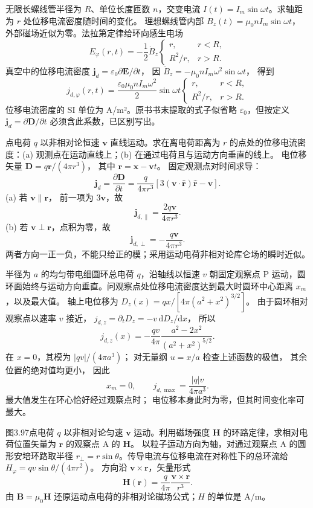 无限长螺线管半径为 $R$、单位长度匝数 $n$，交变电流
$I(t)=I_m\sin\omega t$。求轴距为 $r$ 处位移电流密度随时间的变化。
\exsolution
理想螺线管内部
$B_z(t)=\mu_0nI_m\sin\omega t$，
外部磁场近似为零。法拉第定律给环向感生电场
\[
E_\varphi(r,t)=
-\frac12\dot B_z
\begin{cases}r,&r<R,\\R^2/r,&r>R.\end{cases}
\]
真空中的位移电流密度
$\bm j_d=\varepsilon_0\partial\bm E/\partial t$，
因
$\ddot B_z=-\mu_0nI_m\omega^2\sin\omega t$，
得到
\[
\boxed{j_{d,\varphi}(r,t)=
\frac{\varepsilon_0\mu_0nI_m\omega^2}{2}
\sin\omega t
\begin{cases}r,&r<R,\\R^2/r,&r>R.\end{cases}}
\]
\excheck 位移电流密度的 SI 单位为 A/m²。原书书末提取的式子似省略 $\varepsilon_0$，但按定义 $\bm j_d=\partial\bm D/\partial t$ 必须含此系数，已区别写出。

点电荷 $q$ 以非相对论恒速 $\bm v$ 直线运动。求在离电荷距离为 $r$ 的点处的位移电流密度：(a) 观测点在运动直线上；(b) 在通过电荷且与运动方向垂直的线上。
\exsolution
电位移矢量
$\bm D=q\bm r/(4\pi r^3)$，
其中 $\bm r=\bm x-\bm vt$。
固定观测点对时间求导：
\[
\bm j_d=\frac{\partial\bm D}{\partial t}
=\frac q{4\pi r^3}
\left[3(\bm v\cdot\hat{\bm r})\hat{\bm r}-\bm v\right].
\]
(a) 若 $\bm v\parallel\bm r$，
前一项为 $3\bm v$，故
\[
\boxed{\bm j_{d,\parallel}=\frac{2q\bm v}{4\pi r^3}}.
\]
(b) 若 $\bm v\perp\bm r$，点积为零，故
\[
\boxed{\bm j_{d,\perp}=-\frac{q\bm v}{4\pi r^3}}.
\]
\excheck 两者方向一正一负，不能只给正的模；采用运动电荷非相对论库仑场的瞬时近似。

半径为 $a$ 的均匀带电细圆环总电荷 $q$，沿轴线以恒速 $v$ 朝固定观察点 P 运动，圆环面始终与运动方向垂直。问观察点处位移电流密度达到最大时圆环中心距离 $x_m$，以及最大值。
\exsolution
轴上电位移为
$D_z(x)=qx/[4\pi(a^2+x^2)^{3/2}]$。
由于圆环相对观察点以速率 $v$ 接近，
$j_{d,z}=\partial_t D_z=-v\,\mathrm dD_z/\mathrm dx$，
所以
\[
j_{d,z}(x)=
-\frac{qv}{4\pi}\frac{a^2-2x^2}{(a^2+x^2)^{5/2}}.
\]
在 $x=0$，其模为 $|qv|/(4\pi a^3)$；
对无量纲 $u=x/a$ 检查上述函数的极值，
其余位置的绝对值均更小，
因此
\[
\boxed{x_m=0,\qquad
j_{d,\max}=\frac{|q|v}{4\pi a^3}}.
\]
\excheck 最大值发生在环心恰好经过观察点时；
电位移本身此时为零，但其时间变化率可最大。

图3.97点电荷 $q$ 以非相对论匀速 $\bm v$ 运动。利用磁场强度 $\bm H$ 的环路定律，求相对电荷位置矢量为 $\bm r$ 的观察点 A 的 $\bm H$。
\exsolution
以粒子运动方向为轴，对通过观察点 A 的圆形安培环路取半径 $r_\perp=r\sin\theta$。传导电流与位移电流在对称性下的总环流给
$H_\varphi=qv\sin\theta/(4\pi r^2)$。
方向沿 $\bm v\times\bm r$，矢量形式
\[
\boxed{\bm H(\bm r)=\frac{q}{4\pi}
\frac{\bm v\times\bm r}{r^3}}.
\]
\excheck 由 $\bm B=\mu_0\bm H$ 还原运动点电荷的非相对论磁场公式；$H$ 的单位是 A/m。

